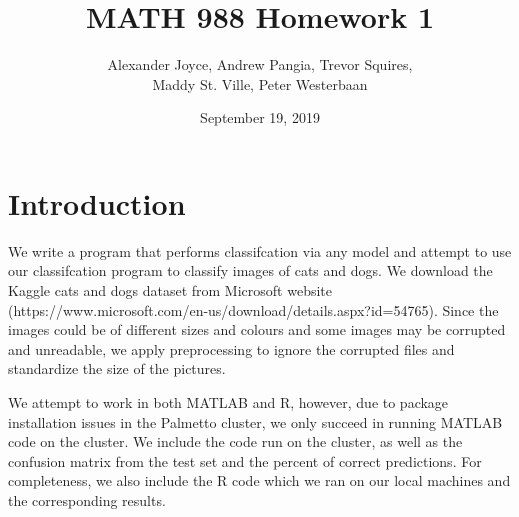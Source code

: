 \documentclass[12pt]{article}
\title{MATH 988 Homework 1}
\author{Alexander Joyce, Andrew Pangia, Trevor Squires, \\Maddy St. Ville, Peter Westerbaan}
\date{September 19, 2019}
\newcommand{\<}{\langle}
\renewcommand{\>}{\rangle}
\theoremstyle{definition}
\begin{document}
\maketitle
\section*{Introduction}
We write a program that performs classifcation via any model and attempt to use our classifcation program to classify images of cats and dogs. We download the Kaggle cats and dogs dataset from Microsoft website (https://www.microsoft.com/en-us/download/details.aspx?id=54765). Since the images could be of different sizes and colours and some
images may be corrupted and unreadable, we apply preprocessing to ignore the corrupted files and standardize the size of the pictures.

We attempt to work in both MATLAB and R, however, due to package installation issues in the Palmetto cluster, we only succeed in running MATLAB code on the cluster. We include the code run on the cluster, as well as the confusion matrix from the test set and the percent of correct predictions. For completeness, we also include the R code which we ran on our local machines and the corresponding results.
\end{document}
